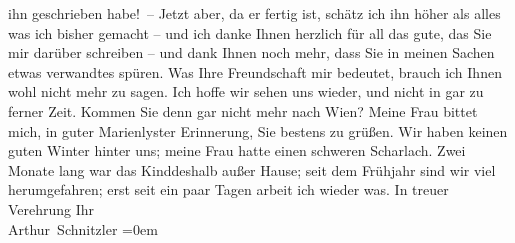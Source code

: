 \begin{ledgroupsized}[t]{13cm}
               ihn geschrieben habe! – Jetzt aber, da er fertig ist, schätz ich ihn höher als alles
               was ich bisher gemacht – und ich danke Ihnen herzlich für all das gute, das Sie mir
                  {\pb}darüber schreiben – und dank Ihnen noch mehr,
               dass Sie in meinen Sachen etwas verwandtes spüren. Was Ihre Freundschaft mir
               bedeutet, brauch ich Ihnen wohl nicht mehr zu sagen. Ich hoffe wir sehen uns wieder,
               und nicht in gar zu ferner Zeit. Kommen Sie denn gar nicht mehr nach Wien?\pend
           \pstart
           Meine Frau bittet mich, in
               guter Marienlyster Erinnerung, Sie bestens zu
               grüßen. Wir haben keinen guten Winter hinter uns; meine Frau hatte einen schweren Scharlach. Zwei
               Monate lang war das Kind\introOben{}deshalb\introOben{} außer Hause; seit dem Frühjahr sind wir viel
               herumgefahren; erst seit ein paar Tagen arbeit ich wieder was.\pend
           \pstart
           In treuer Verehrung Ihr{\\[\baselineskip]}\spacefill\mbox{Arthur Schnitzler}\pend
           \leftskip=0em{}
         
         \endnumbering{}\end{ledgroupsized}  \newcommand{\dateiname}{L01779}\newcommand{\titel}{Arthur Schnitzler an Georg Brandes, 4. 7. 1908}\newcommand{\editorInnen}{Martin Anton Müller und Gerd-Hermann Susen}
      